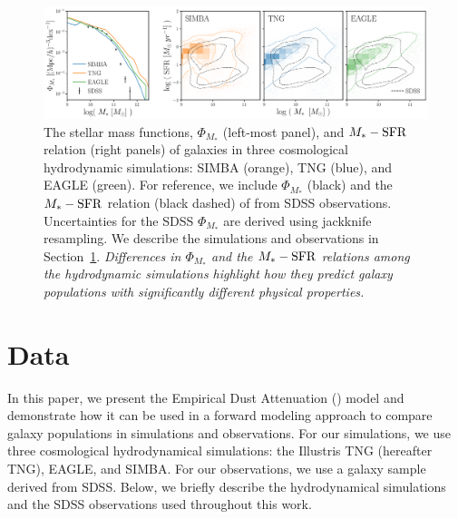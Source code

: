 \begin{figure}
\begin{center}
    \includegraphics[width=\textwidth]{figs/smf_m_sfr.pdf}
    \caption{\label{fig:smf_msfr}
    The stellar mass functions, $\Phi_{M_*}$ (left-most panel), and $M_*-{\rm SFR}$
    relation (right panels) of galaxies in three cosmological hydrodynamic 
    simulations: SIMBA (orange), TNG (blue), and EAGLE (green). 
    For reference, we include $\Phi_{M_*}$ (black) and the $M_*-{\rm SFR}$ relation 
    (black dashed) of from SDSS observations. Uncertainties for the 
    SDSS $\Phi_{M_*}$ are derived using jackknife resampling. We describe the
    simulations and observations in Section~\ref{sec:sims}. \emph{Differences
    in $\Phi_{M_*}$ and the $M_*-{\rm SFR}$ relations among the hydrodynamic simulations 
    highlight how they predict galaxy populations with significantly different
    physical properties.} 
    }
\end{center}
\end{figure}

\section{Data}\label{sec:sims}
In this paper, we present the Empirical Dust Attenuation (\eda) model and
demonstrate how it can be used in a forward modeling approach to compare galaxy
populations in simulations and observations. For our simulations, we use three
cosmological hydrodynamical simulations: the Illustris TNG (hereafter TNG),
EAGLE, and SIMBA. For our observations, we use a galaxy sample derived from
SDSS. Below, we briefly describe the hydrodynamical simulations and the SDSS
observations used throughout this work.

